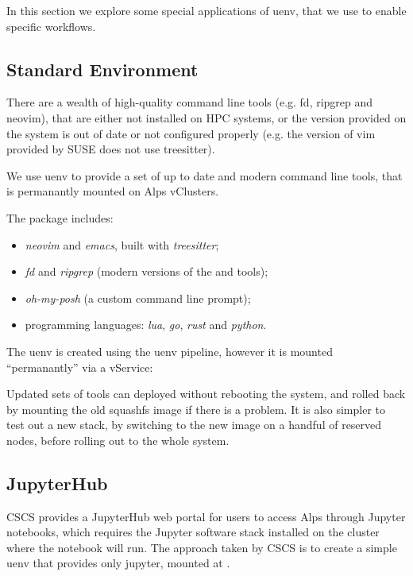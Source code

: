 In this section we explore some special applications of uenv, that we use to enable specific workflows.

\subsection{Standard Environment}

There are a wealth of high-quality command line tools (e.g. fd, ripgrep and neovim), that are either not installed on HPC systems, or the version provided on the system is out of date or not configured properly (e.g. the version of vim provided by SUSE does not use treesitter).

We use uenv to provide a set of up to date and modern command line tools, that is permanantly mounted on Alps vClusters.

The package includes:
\begin{itemize}
    \item \emph{neovim} and \emph{emacs}, built with \emph{treesitter};
    \item \emph{fd} and \emph{ripgrep} (modern versions of the  and  tools);
    \item \emph{oh-my-posh} (a custom command line prompt);
    \item programming languages: \emph{lua}, \emph{go}, \emph{rust} and \emph{python}.
\end{itemize}

The uenv is created using the uenv pipeline, however it is mounted ``permanantly'' via a vService:


Updated sets of tools can deployed without rebooting the system, and rolled back by mounting the old squashfs image if there is a problem.
It is also simpler to test out a new stack, by switching to the new image on a handful of reserved nodes, before rolling out to the whole system.

\subsection{JupyterHub}

CSCS provides a JupyterHub web portal for users to access Alps through Jupyter notebooks, which requires the Jupyter software stack installed on the cluster where the notebook will run.
The approach taken by CSCS is to create a simple  uenv that provides only jupyter, mounted at .

